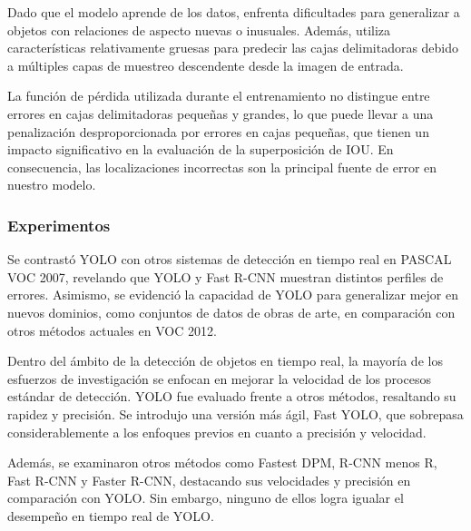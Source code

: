 Dado que el modelo aprende de los datos, enfrenta dificultades para generalizar a objetos con relaciones de aspecto nuevas o inusuales. Además, utiliza características relativamente gruesas para predecir las cajas delimitadoras debido a múltiples capas de muestreo descendente desde la imagen de entrada.

La función de pérdida utilizada durante el entrenamiento no distingue entre errores en cajas delimitadoras pequeñas y grandes, lo que puede llevar a una penalización desproporcionada por errores en cajas pequeñas, que tienen un impacto significativo en la evaluación de la superposición de IOU. En consecuencia, las localizaciones incorrectas son la principal fuente de error en nuestro modelo.

\subsubsection{Experimentos}
Se contrastó YOLO con otros sistemas de detección en tiempo real en PASCAL VOC 2007, revelando que YOLO y Fast R-CNN muestran distintos perfiles de errores. Asimismo, se evidenció la capacidad de YOLO para generalizar mejor en nuevos dominios, como conjuntos de datos de obras de arte, en comparación con otros métodos actuales en VOC 2012.

Dentro del ámbito de la detección de objetos en tiempo real, la mayoría de los esfuerzos de investigación se enfocan en mejorar la velocidad de los procesos estándar de detección. YOLO fue evaluado frente a otros métodos, resaltando su rapidez y precisión. Se introdujo una versión más ágil, Fast YOLO, que sobrepasa considerablemente a los enfoques previos en cuanto a precisión y velocidad.

Además, se examinaron otros métodos como Fastest DPM, R-CNN menos R, Fast R-CNN y Faster R-CNN, destacando sus velocidades y precisión en comparación con YOLO. Sin embargo, ninguno de ellos logra igualar el desempeño en tiempo real de YOLO.
 
